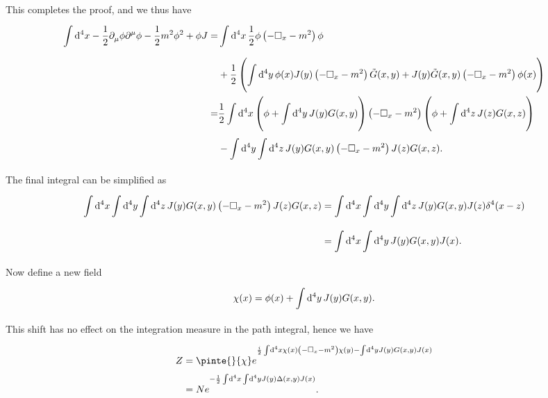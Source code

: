 This completes the proof, and we thus have
\begin{align*}
	\int\limits_{}^{}\dd[4]{x}-\frac{1}{2}\partial^{}_{\mu}\phi\partial^{\mu}_{}\phi - \frac{1}{2}m^{2}\phi^{2} + \phi J =& \int\limits_{}^{}\dd[4]{x}\frac{1}{2}\phi\left(-\square_{x} - m^{2}\right)\phi \\
	&+ \frac{1}{2}\left(\int\limits_{}^{}\dd[4]{y}\phi(x)J(y)\left(-\square_{x} - m^{2}\right)\tilde{G}(x, y) + J(y)\tilde{G}(x, y)\left(-\square_{x} - m^{2}\right)\phi(x)\right) \\
	=& \frac{1}{2}\int\limits_{}^{}\dd[4]{x}\left(\phi + \int\limits_{}^{}\dd[4]{y}J(y)G(x, y)\right)\left(-\square_{x} - m^{2}\right)\left(\phi + \int\limits_{}^{}\dd[4]{z}J(z)G(x, z)\right) \\
	 &- \int\limits_{}^{}\dd[4]{y}\int\limits_{}^{}\dd[4]{z}J(y)G(x, y)\left(-\square_{x} - m^{2}\right)J(z)G(x, z).
\end{align*}
The final integral can be simplified as
\begin{align*}
	\int\limits_{}^{}\dd[4]{x}\int\limits_{}^{}\dd[4]{y}\int\limits_{}^{}\dd[4]{z}J(y)G(x, y)\left(-\square_{x} - m^{2}\right)J(z)G(x, z) &= \int\limits_{}^{}\dd[4]{x}\int\limits_{}^{}\dd[4]{y}\int\limits_{}^{}\dd[4]{z}J(y)G(x, y)J(z)\delta^{4}(x - z) \\
	                           &= \int\limits_{}^{}\dd[4]{x}\int\limits_{}^{}\dd[4]{y}J(y)G(x, y)J(x).
\end{align*}
Now define a new field
\begin{align*}
	\chi(x) = \phi(x) + \int\limits_{}^{}\dd[4]{y}J(y)G(x, y).
\end{align*}
This shift has no effect on the integration measure in the path integral, hence we have
\begin{align*}
	Z &= \pinte{}{\chi}e^{\frac{i}{2}\integ[4]{}{}{x}{\chi(x)\left(-\dalem_{x} - m^{2}\right)\chi(y) - \integ[4]{}{}{y}{J(y)G(x, y)J(x)}}} \\
	  &= Ne^{-\frac{1}{2}\integ[4]{}{}{x}{\integ[4]{}{}{y}{J(y)\Delta(x, y)J(x)}}}.
\end{align*}

